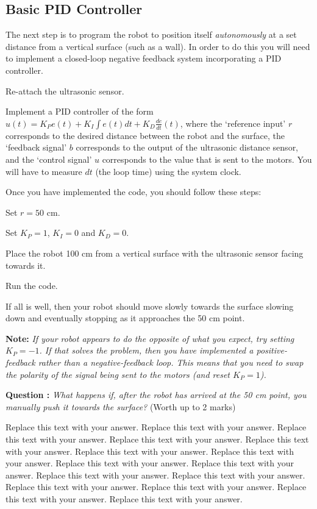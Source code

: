 \documentclass[hidelinks,a4paper,11pt]{article}
\newcounter{question}
\newcommand\myq{\refstepcounter{question}\thequestion}
\begin{document}
\subsection{Basic PID Controller}

The next step is to program the robot to position itself \emph{autonomously} at a set distance from a vertical surface (such as a wall).  In order to do this you will need to implement a closed-loop negative feedback system incorporating a PID controller.  

\begin{todolist}
	\item Re-attach the ultrasonic sensor.
	\item Implement a PID controller of the form $u(t) = K_P e(t) + K_I \int e(t)dt + K_D \frac{de}{dt}(t)$, where the `reference input' $r$ corresponds to the desired distance between the robot and the surface, the `feedback signal' $b$ corresponds to the output of the ultrasonic distance sensor, and the `control signal' $u$ corresponds to the value that is sent to the motors.  You will have to measure $dt$ (the loop time) using the system clock.
\end{todolist}

Once you have implemented the code, you should follow these steps:
\begin{todolist}
	\item Set $r=50$ cm.
	\item Set $K_P=1$, $K_I=0$ and $K_D=0$.
	\item Place the robot 100 cm from a vertical surface with the ultrasonic sensor facing towards it.
	\item Run the code.
\end{todolist}

If all is well, then your robot should move slowly towards the surface slowing down and eventually stopping as it approaches the 50 cm point.

{\bfseries Note:}  \emph{If your robot appears to do the opposite of what you expect, try setting $K_P=-1$.  If that solves the problem, then you have implemented a positive-feedback rather than a negative-feedback loop.  This means that you need to swap the polarity of the signal being sent to the motors (and reset $K_P=1$).}

{\bfseries Question \myq:}  \emph{What happens if, after the robot has arrived at the 50 cm point, you manually push it towards the surface?} (Worth up to 2 marks)\\
\begin{mdframed}
Replace this text with your answer.  Replace this text with your answer.  Replace this text with your answer.  Replace this text with your answer.  Replace this text with your answer.  Replace this text with your answer.  Replace this text with your answer.  Replace this text with your answer.  Replace this text with your answer.  Replace this text with your answer.  Replace this text with your answer.  Replace this text with your answer.  Replace this text with your answer.  Replace this text with your answer.  Replace this text with your answer.
\end{mdframed}
\vspace*{\baselineskip}
\end{document}
